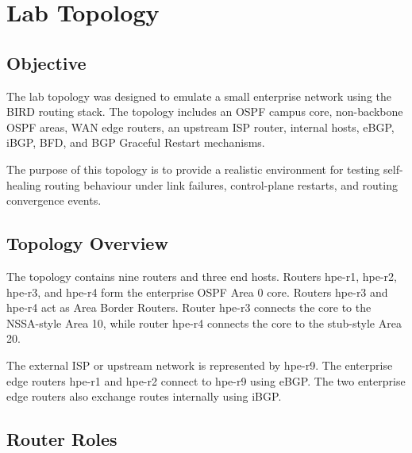 \section{Lab Topology}

\subsection{Objective}

The lab topology was designed to emulate a small enterprise network using the BIRD routing stack. The topology includes an OSPF campus core, non-backbone OSPF areas, WAN edge routers, an upstream ISP router, internal hosts, eBGP, iBGP, BFD, and BGP Graceful Restart mechanisms.

The purpose of this topology is to provide a realistic environment for testing self-healing routing behaviour under link failures, control-plane restarts, and routing convergence events.

\subsection{Topology Overview}

The topology contains nine routers and three end hosts. Routers hpe-r1, hpe-r2, hpe-r3, and hpe-r4 form the enterprise OSPF Area 0 core. Routers hpe-r3 and hpe-r4 act as Area Border Routers. Router hpe-r3 connects the core to the NSSA-style Area 10, while router hpe-r4 connects the core to the stub-style Area 20.

The external ISP or upstream network is represented by hpe-r9. The enterprise edge routers hpe-r1 and hpe-r2 connect to hpe-r9 using eBGP. The two enterprise edge routers also exchange routes internally using iBGP.

\subsection{Router Roles}

